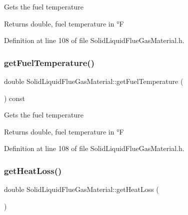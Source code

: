 Gets the fuel temperature \begin{DoxyReturn}{Returns}
double, fuel temperature in °F 
\end{DoxyReturn}


Definition at line 108 of file Solid\+Liquid\+Flue\+Gas\+Material.\+h.

\mbox{\label{class_solid_liquid_flue_gas_material_a629ecc7104b6bfbb696d9478c4b48e7a}} 
\subsubsection{\texorpdfstring{get\+Fuel\+Temperature()}{getFuelTemperature()}\hspace{0.1cm}{\footnotesize\ttfamily [3/3]}}
{\footnotesize\ttfamily double Solid\+Liquid\+Flue\+Gas\+Material\+::get\+Fuel\+Temperature (\begin{DoxyParamCaption}{ }\end{DoxyParamCaption}) const\hspace{0.3cm}{\ttfamily [inline]}}

Gets the fuel temperature \begin{DoxyReturn}{Returns}
double, fuel temperature in °F 
\end{DoxyReturn}


Definition at line 108 of file Solid\+Liquid\+Flue\+Gas\+Material.\+h.

\mbox{\label{class_solid_liquid_flue_gas_material_af7d36673e49f9b5eb631fc04227883d6}} 
\subsubsection{\texorpdfstring{get\+Heat\+Loss()}{getHeatLoss()}\hspace{0.1cm}{\footnotesize\ttfamily [1/3]}}
{\footnotesize\ttfamily double Solid\+Liquid\+Flue\+Gas\+Material\+::get\+Heat\+Loss (\begin{DoxyParamCaption}{ }\end{DoxyParamCaption})}

